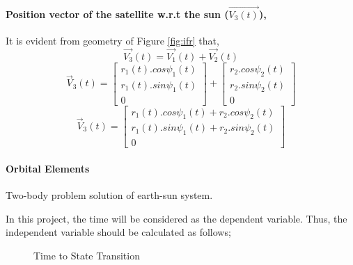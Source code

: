 \documentclass[11pt]{article}
\begin{document}
\paragraph{Position vector of the satellite w.r.t the sun ($\vec{V_3(t)}$),}

It is evident from geometry of Figure \ref{fig:ifr} that,
\begin{equation}
    \vec{V_3}(t) = \vec{V_1}(t) + \vec{V_2}(t)
\end{equation}
\begin{equation}
    \vec{V}_3(t)  = 
            \begin{bmatrix}
            r_1(t) . cos{\psi_1(t)}  \\
            r_1(t) . sin{\psi_1(t)} \\
             0             
            \end{bmatrix} 
            +
            \begin{bmatrix}
            r_2 . cos{\psi_2(t)}  \\
            r_2 . sin{\psi_2(t)} \\
             0             
            \end{bmatrix}  
\end{equation}
\begin{equation}
    \vec{V}_3(t)  =  
            \begin{bmatrix}
            r_1(t) . cos{\psi_1(t)} +r_2 . cos{\psi_2(t)}  \\
            r_1(t) . sin{\psi_1(t)} +r_2 . sin{\psi_2(t)} \\
             0                                
            \end{bmatrix} 
\end{equation}


\paragraph{Orbital Elements}


Two-body problem solution of earth-sun system\cite{fortescue2011spacecraft}.  
 

In this project, the time will be considered as the dependent variable. Thus, the independent variable should be calculated as follows;

\begin{figure}[h]
\centering
{}
\caption{Time to State Transition}
\label{fig:2}
\end{figure}
\end{document}
